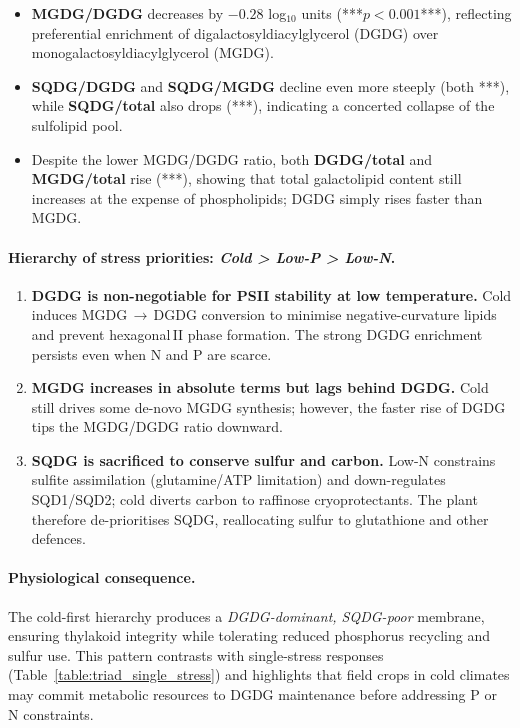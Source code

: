 \documentclass[10pt,letterpaper]{article}
\begin{document}
\begin{itemize}
  \item \textbf{MGDG/DGDG} decreases by $-0.28$ log$_{10}$ units
        (***$p<0.001$***), reflecting preferential enrichment of
        digalactosyldiacylglycerol (DGDG) over monogalactosyldiacylglycerol (MGDG).
  \item \textbf{SQDG/DGDG} and \textbf{SQDG/MGDG} decline even more steeply
        (both ***), while \textbf{SQDG/total} also drops (***),
        indicating a concerted collapse of the sulfolipid pool.
  \item Despite the lower MGDG/DGDG ratio, both \textbf{DGDG/total} and
        \textbf{MGDG/total} rise (***), showing that total galactolipid
        content still increases at the expense of phospholipids; DGDG simply
        rises faster than MGDG.
\end{itemize}

\paragraph{Hierarchy of stress priorities: \textit{Cold > Low-P > Low-N}.}
\begin{enumerate}
  \item \textbf{DGDG is non-negotiable for PSII stability at low temperature.}  
        Cold induces MGDG\,$\rightarrow$\,DGDG conversion to minimise
        negative-curvature lipids and prevent hexagonal\,II phase formation.
        The strong DGDG enrichment persists even when N and P are scarce.
  \item \textbf{MGDG increases in absolute terms but lags behind DGDG.}  
        Cold still drives some de-novo MGDG synthesis; however,
        the faster rise of DGDG tips the MGDG/DGDG ratio downward.
  \item \textbf{SQDG is sacrificed to conserve sulfur and carbon.}  
        Low-N constrains sulfite assimilation (glutamine/ATP limitation) and
        down-regulates SQD1/SQD2; cold diverts carbon to raffinose
        cryoprotectants.  The plant therefore de-prioritises SQDG,
        reallocating sulfur to glutathione and other defences.
\end{enumerate}

\paragraph{Physiological consequence.}
The cold-first hierarchy produces a \emph{DGDG-dominant, SQDG-poor} membrane,
ensuring thylakoid integrity while tolerating reduced phosphorus recycling
and sulfur use.  This pattern contrasts with single-stress responses
(Table~\ref{table:triad_single_stress}) and highlights that field crops in
cold climates may commit metabolic resources to DGDG maintenance before
addressing P or N constraints.
\end{document}
